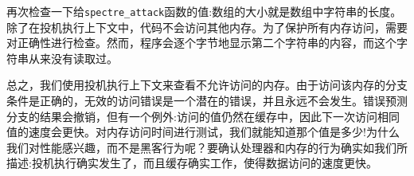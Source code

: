 再次检查一下给\texttt{spectre\_attack}函数的值:数组的大小就是数组中字符串的长度。除了在投机执行上下文中，代码不会访问其他内存。为了保护所有内存访问，需要对正确性进行检查。然而，程序会逐个字节地显示第二个字符串的内容，而这个字符串从来没有读取过。

总之，我们使用投机执行上下文来查看不允许访问的内存。由于访问该内存的分支条件是正确的，无效的访问错误是一个潜在的错误，并且永远不会发生。错误预测分支的结果会撤销，但有一个例外:访问的值仍然在缓存中，因此下一次访问相同值的速度会更快。对内存访问时间进行测试，我们就能知道那个值是多少!为什么我们对性能感兴趣，而不是黑客行为呢？要确认处理器和内存的行为确实如我们所描述:投机执行确实发生了，而且缓存确实工作，使得数据访问的速度更快。



















